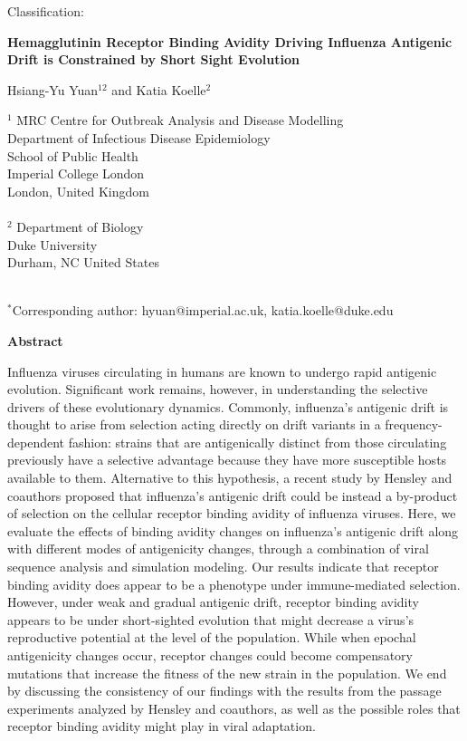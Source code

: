 \documentclass[12pt,a4paper]{article}
\begin{document}
Classification: 

\large {\bf Hemagglutinin Receptor Binding Avidity Driving Influenza Antigenic Drift is Constrained by Short Sight Evolution} \normalsize

Hsiang-Yu Yuan$^{12}$ and Katia Koelle$^2$

\begin{tabbing}
$^1$ 	\= MRC Centre for Outbreak Analysis and Disease Modelling \\
		\> Department of Infectious Disease Epidemiology \\
		\> School of Public Health \\
		\> Imperial College London \\
		\> London, United Kingdom \\ \\
		
$^2$ 	\> Department of Biology \\
        \> Duke University \\
        \> Durham, NC United States \\ \\
		

\end{tabbing}
\doublespacing
$^*$Corresponding author: hyuan@imperial.ac.uk, katia.koelle@duke.edu 
\clearpage


{\bf Abstract}

Influenza viruses circulating in humans are known to undergo rapid antigenic evolution. Significant work remains, however, in understanding the selective drivers of these evolutionary dynamics. Commonly, influenza’s antigenic drift is thought to arise from selection acting directly on drift variants in a frequency-dependent fashion: strains that are antigenically distinct from those circulating previously have a selective advantage because they have more susceptible hosts available to them. Alternative to this hypothesis, a recent study by Hensley and coauthors proposed that influenza’s antigenic drift could be instead a by-product of selection on the cellular receptor binding avidity of influenza viruses. Here, we evaluate the effects of binding avidity changes on influenza’s antigenic drift along with different modes of antigenicity changes, through a combination of viral sequence analysis and simulation modeling. Our results indicate that receptor binding avidity does appear to be a phenotype under immune-mediated selection. However, under weak and gradual antigenic drift, receptor binding avidity appears to be under short-sighted evolution that might decrease a virus’s reproductive potential at the level of the population. While when epochal antigenicity changes occur, receptor changes could become compensatory mutations that increase the fitness of the new strain in the population. We end by discussing the consistency of our findings with the results from the passage experiments analyzed by Hensley and coauthors, as well as the possible roles that receptor binding avidity might play in viral adaptation. 
\end{document}
